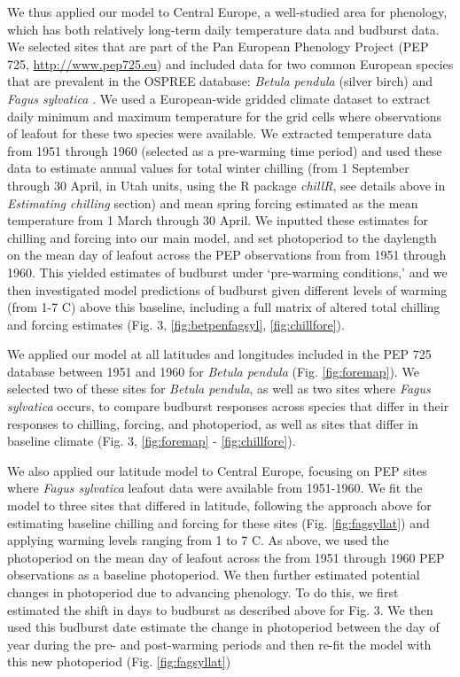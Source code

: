 \documentclass{article}
\begin{document}
\par We thus applied our model to Central Europe, a well-studied area for phenology, which has both relatively long-term daily temperature data and budburst data. We selected sites that are part of the Pan European Phenology Project (PEP 725, \url{http://www.pep725.eu}) and included data for two common European species that are prevalent in the OSPREE database: \emph{Betula pendula} (silver birch) and \emph{Fagus sylvatica} \citep[European beech][]{Templ2018}. We used a European-wide gridded climate dataset \citep{cornes2018} to extract daily minimum and maximum temperature for the grid cells where observations of leafout for these two species were available. We extracted temperature data from 1951 through 1960 (selected as a pre-warming time period) and used these data to estimate annual values for total winter chilling (from 1 September through 30 April, in Utah units, using the R package \textit{chillR}, see details above in \emph{Estimating chilling} section) and mean spring forcing estimated as the mean temperature from 1 March through 30 April. We inputted these estimates for chilling and forcing into our main model, and set photoperiod to the daylength on the mean day of leafout across the PEP observations from from 1951 through 1960. This yielded estimates of budburst under `pre-warming conditions,' and we then investigated model predictions of budburst given different levels of warming (from 1-7 \degree C) above this baseline, including a full matrix of altered total chilling and forcing estimates (Fig. 3, \ref{fig:betpenfagsyl}, \ref{fig:chillfore}). 
\par We applied our model at all latitudes and longitudes included in the PEP 725 database between 1951 and 1960 for \emph{Betula pendula} (Fig. \ref{fig:foremap}). We selected two of these sites for \emph{Betula pendula}, as well as two sites where \emph{Fagus sylvatica} occurs, to compare budburst responses across species that differ in their responses to chilling, forcing, and photoperiod, as well as sites that differ in baseline climate (Fig. 3, \ref{fig:foremap} - \ref{fig:chillfore}).
\par We also applied our latitude model to Central Europe, focusing on PEP sites where \emph{Fagus sylvatica} leafout data were available from 1951-1960. We fit the model to three sites that differed in latitude, following the approach above for estimating baseline chilling and forcing for these sites (Fig. \ref{fig:fagsyllat}) and applying warming levels ranging from 1 to 7 \degree C.   As above, we used the photoperiod on the mean day of leafout across the from 1951 through 1960 PEP observations as a baseline photoperiod. We then further estimated potential changes in photoperiod due to advancing phenology. To do this, we first estimated the shift in days to budburst as described above for Fig. 3. %
We then used this budburst date estimate the change in photoperiod between the day of year during the pre- and post-warming periods and then re-fit the model with this new photoperiod (Fig. \ref{fig:fagsyllat})
\end{document}
